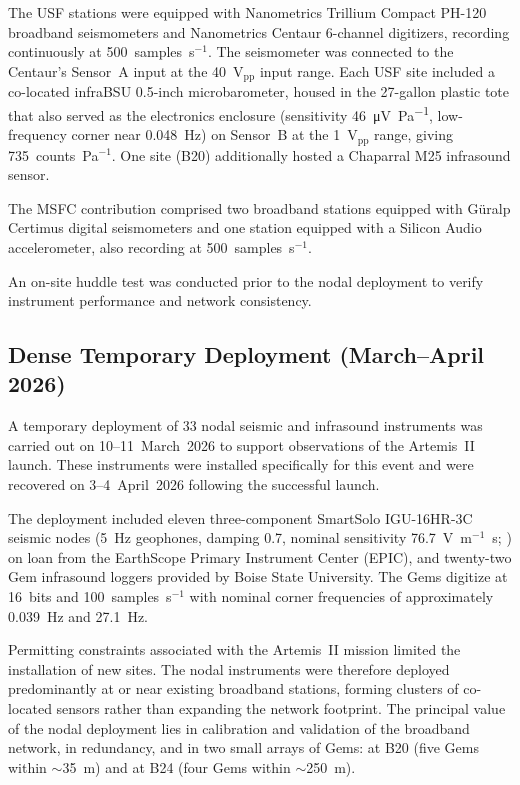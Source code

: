 \documentclass[]{seismica}
\begin{document}
The USF stations were equipped with Nanometrics Trillium Compact PH-120
broadband seismometers and Nanometrics Centaur 6-channel digitizers,
recording continuously at 500~samples~s$^{-1}$. The seismometer was
connected to the Centaur's Sensor~A input at the 40~V$_\text{pp}$ input
range. Each USF site included a co-located infraBSU 0.5-inch
microbarometer, housed in the 27-gallon plastic tote that also served as the
electronics enclosure (sensitivity \SI{46}{\micro\volt\per\pascal},
low-frequency corner near 0.048~Hz) on Sensor~B at the 1~V$_\text{pp}$
range, giving 735~counts~Pa$^{-1}$. One site (B20) additionally hosted a
Chaparral M25 infrasound sensor.

The MSFC contribution comprised two broadband stations equipped with
G\"{u}ralp Certimus digital seismometers and one station equipped with a
Silicon Audio accelerometer, also recording at 500~samples~s$^{-1}$.

An on-site huddle test was conducted prior to the nodal deployment to
verify instrument performance and network consistency.

\subsection{Dense Temporary Deployment (March--April 2026)}

A temporary deployment of 33 nodal seismic and infrasound instruments
was carried out on 10--11~March~2026 to support observations of the
Artemis~II launch. These instruments were installed specifically for
this event and were recovered on 3--4~April~2026 following the
successful launch.

The deployment included eleven three-component SmartSolo IGU-16HR-3C
seismic nodes (5~Hz geophones, damping 0.7, nominal sensitivity
76.7~V~m$^{-1}$~s; \citealp{SmartSolo2023}) on loan from the EarthScope
Primary Instrument Center (EPIC), and twenty-two Gem infrasound loggers
provided by Boise State University. The Gems digitize at 16~bits and
100~samples~s$^{-1}$ with nominal corner frequencies of approximately
0.039~Hz and 27.1~Hz.

Permitting constraints associated with the Artemis~II mission limited
the installation of new sites. The nodal instruments were therefore
deployed predominantly at or near existing broadband stations, forming
clusters of co-located sensors rather than expanding the network
footprint. The principal value of the nodal deployment lies in
calibration and validation of the broadband network, in redundancy, and
in two small arrays of Gems: at B20 (five Gems within $\sim$35~m) and at
B24 (four Gems within $\sim$250~m).
\end{document}
